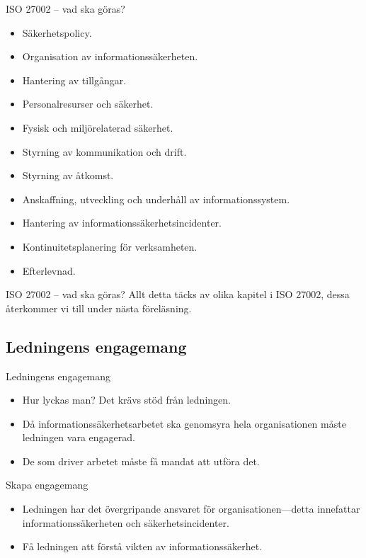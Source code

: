 \documentclass{beamer}
\begin{document}
\begin{frame}{ISO 27002 -- vad ska göras?}
  \begin{itemize}
    \item Säkerhetspolicy.
    \item Organisation av informationssäkerheten.
    \item Hantering av tillgångar.
    \item Personalresurser och säkerhet.
    \item Fysisk och miljörelaterad säkerhet.
    \item Styrning av kommunikation och drift.
    \item Styrning av åtkomst.
    \item Anskaffning, utveckling och underhåll av informationssystem.
    \item Hantering av informationssäkerhetsincidenter.
    \item Kontinuitetsplanering för verksamheten.
    \item Efterlevnad.
  \end{itemize}
\end{frame}

\begin{frame}{ISO 27002 -- vad ska göras?}
  Allt detta täcks av olika kapitel i ISO 27002, dessa återkommer vi till under 
  nästa föreläsning.
\end{frame}

\subsection{Ledningens engagemang}

\begin{frame}{Ledningens engagemang}
  \begin{itemize}
    \item Hur lyckas man?
      Det krävs stöd från ledningen.

    \item Då informationssäkerhetsarbetet ska genomsyra hela organisationen 
      måste ledningen vara engagerad.

    \item De som driver arbetet måste få mandat att utföra det.

  \end{itemize}
\end{frame}

\begin{frame}{Skapa engagemang}
  \begin{itemize}
    \item Ledningen har det övergripande ansvaret för organisationen---detta 
      innefattar informationssäkerheten och säkerhetsincidenter.

    \item Få ledningen att förstå vikten av informationssäkerhet.

  \end{itemize}
\end{frame}
\end{document}
